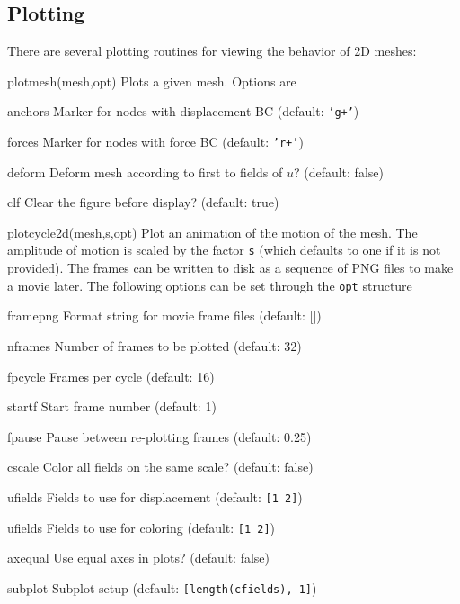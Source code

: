 \documentclass{article}
\newenvironment{codelist}[1][\quad]%
  {\begin{list}{}{%
   \settowidth{\labelwidth}{\texttt{#1}\hfil}%
   \setlength{\leftmargin}{\labelwidth}%
   \addtolength{\leftmargin}{\labelsep}%
   \addtolength{\leftmargin}{\parindent}%
   \renewcommand{\makelabel}[1]{\texttt{##1}}}}%
  {\end{list}}
\newcommand{\ttt}[1]{\texttt{#1}}
\begin{document}
\subsection{Plotting}

There are several plotting routines for viewing the behavior of 2D
meshes:
\begin{codelist}

  \item[plotmesh(mesh,opt)]  Plots a given mesh.  Options are
    \begin{codelist}
      \item[anchors]  Marker for nodes with displacement BC
	(default: \ttt{'g+'})
      \item[forces]   Marker for nodes with force BC
	(default: \ttt{'r+'})
      \item[deform]   Deform mesh according to first to fields of $u$?
	(default: false)
      \item[clf]      Clear the figure before display?
        (default: true)
    \end{codelist}

  \item[plotcycle2d(mesh,s,opt)]
    Plot an animation of the motion of the mesh.  The amplitude of
    motion is scaled by the factor \ttt{s} (which defaults to one
    if it is not provided).  The frames can be written to disk as a
    sequence of PNG files to make a movie later.
    The following options can be set through the \ttt{opt} structure
    \begin{codelist}[framepng]
      \item[framepng] Format string for movie frame files (default: [])
      \item[nframes]  Number of frames to be plotted (default: 32)
      \item[fpcycle]  Frames per cycle (default: 16)
      \item[startf]   Start frame number (default: 1)
      \item[fpause]   Pause between re-plotting frames (default: 0.25)
      \item[cscale]   Color all fields on the same scale? (default: false)
      \item[ufields]  Fields to use for displacement 
	(default: \ttt{[1 2]})
      \item[ufields]  Fields to use for coloring
	(default: \ttt{[1 2]})
      \item[axequal]  Use equal axes in plots? (default: false)
      \item[subplot]  Subplot setup (default: \ttt{[length(cfields), 1]})
    \end{codelist}
\end{codelist}
\end{document}
